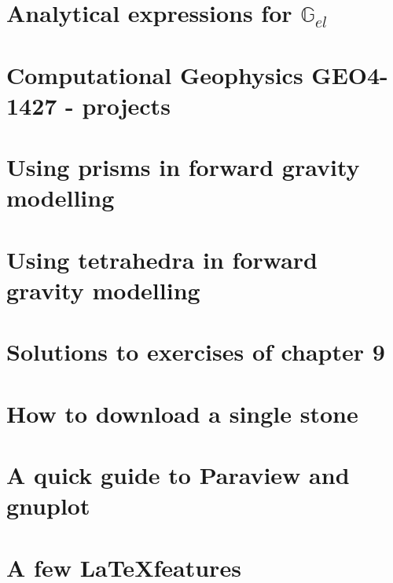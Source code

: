\documentclass[a4paper]{article}
\numberwithin{equation}{section}
\newcommand{\G}{{\mathbb{G}}}
\begin{document}
\section{Analytical expressions for $\G_{el}$} \label{app:Gel} %
\newpage %
\section{Computational Geophysics GEO4-1427 - projects}  %
\newpage %
\section{Using prisms in forward gravity modelling \label{app:prisms}} 
\newpage %
\section{Using tetrahedra in forward gravity modelling} \label{app:tetra} 
\section{Solutions to exercises of chapter 9 \label{app:gravsols}}  %
\newpage %
\section{How to download a single stone}  %
\newpage %
\section{A quick guide to Paraview and gnuplot} %
\newpage %
\section{A few \LaTeX features}  %
\newpage %
\end{document}
